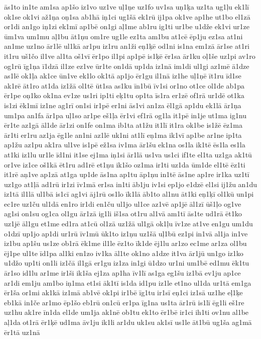 {ās1to
in1te
am1sa
ap1šo
iz1vo
uz1ve
uļ1ņe
uz1fo
uv1sa
uņ1ķa
uz1ta
ug1ļu
ek1lī
ok1se
ok1vi
až1ņa
oņ1sa
ab1hā
iņ1ci
ug1šā
ek1rū
ij1pa
ok1ve
ap1he
ut1bo
el1zā
or1di
an1go
iņ1zi
ek1mī
ap1bē
on1gi
aļ1me
ab1ru
ig1ti
ur1be
u1dže
ek1vi
ur1ze
ūm1va
um1mu
aļ1bu
āt1ņu
om1re
ug1le
ez1ta
am1bu
at1cē
ēp1ju
ez1sa
at1ni
an1me
uz1no
ār1lē
ul1kā
ar1pu
iz1ru
an1ži
eņ1ķē
od1ni
is1na
em1zā
ār1se
at1ri
it1ru
uš1čo
il1ve
al1ta
oš1vī
ēr1po
il1pi
ap1pē
is1ķē
ēr1sa
ār1ku
oļ1še
uz1pi
av1ro
og1rū
īg1ņa
ī1dzā
il1ze
ez1ve
ūr1te
on1dā
up1da
iz1nā
im1di
ul1gi
az1mē
ā1dze
as1lē
ok1ļa
ak1ce
ūn1ve
ek1lo
ok1tā
ap1jo
ēr1gu
il1nā
iz1he
uļ1ņē
īt1ru
īd1se
ak1rē
āt1ro
at1da
iz1žā
ol1tē
ūt1sa
as1ku
īn1bū
īv1si
or1no
ot1ce
ol1de
ab1pa
ēr1pe
oņ1ko
ok1na
ev1ze
us1ri
ip1ti
eķ1tu
op1ta
īs1ra
er1zē
of1rā
ur1dē
ot1ka
is1zi
ēk1mī
iz1ne
ag1rī
on1si
ir1pē
er1ni
ās1vi
an1za
ēl1gā
ap1du
ek1lā
ār1ņa
um1pa
an1fa
ār1pa
uļ1so
ar1pe
eš1ļa
ēr1vi
ef1rā
og1la
it1pē
in1je
ut1ma
ig1nu
ēr1te
az1gā
āl1de
ār1zi
on1fe
on1ma
ib1ta
at1žu
it1lī
it1ra
ok1be
is1žē
ēz1ma
ār1ti
er1ru
az1ja
ēg1le
an1ni
az1lē
uk1ni
at1lī
eņ1ma
ik1vī
ap1be
ar1ne
ip1ta
ap1žu
az1pu
ak1ra
ul1ve
is1pē
ež1sa
iv1ma
ār1šu
ek1na
os1la
ik1tē
ēs1la
es1la
at1ki
iz1lu
ur1le
īd1ni
it1se
ej1ma
iņ1si
ār1lā
us1va
us1ci
if1te
el1ta
uz1ga
ak1tū
or1ve
iz1ce
oš1kā
ēt1ru
ad1rē
et1ņu
ik1šo
oz1ma
ir1ti
uz1da
ūm1de
el1tē
ēz1ti
it1rē
aņ1ve
ap1zā
at1ga
up1de
ās1na
ap1tu
āp1ņu
in1tē
ās1ne
ap1re
ir1ka
uz1tī
uz1go
at1ļā
ad1rū
ir1zi
īv1mā
er1sa
in1ti
āb1ju
iv1si
ep1jo
e1dzē
el1si
ij1žu
an1du
iz1tā
il1lā
ul1bā
is1cī
ag1vi
āj1rū
os1lo
īk1lā
āb1to
al1nu
āt1ki
eņ1ķī
ol1kū
un1pi
ec1re
uz1ču
ul1dā
en1ro
ir1di
en1ču
ul1jo
ul1ce
az1vē
ap1jē
āl1zī
ūš1ļo
og1ve
ag1si
on1su
og1ca
ol1gu
ār1zā
ig1li
iš1sa
ot1ru
al1vā
am1tī
ās1te
ud1rā
ēt1ko
uz1jē
āl1gu
et1me
ed1ra
at1cū
ol1zā
uz1žā
ul1gā
ok1ļu
īv1ze
at1ve
en1gu
um1du
o1dzī
up1jo
ap1di
ur1rū
īv1mū
ūk1to
iz1ņu
uz1šā
uļ1bū
ez1pi
in1vā
al1ja
in1ve
iz1bu
ap1šu
us1ze
ob1rā
ēk1me
il1le
ēz1to
īk1de
ēj1lu
ar1zo
ec1me
ar1za
ol1bu
ēj1pe
ul1te
īd1pa
al1ki
en1zo
iv1ka
āl1te
ok1no
a1dze
it1va
ār1jū
un1go
iz1ko
u1džo
up1ti
on1li
iz1čā
il1gā
er1gu
iz1za
in1gi
ū1dzo
ur1ni
um1bē
ed1mu
ēk1tu
ār1so
id1lu
ar1me
ir1ši
ik1ša
ej1za
ap1ha
īv1lī
as1ga
eg1šu
iz1bā
ev1ju
ap1ce
ar1di
em1ju
am1bo
iņ1ma
et1si
āk1tī
is1da
id1pu
iz1le
et1no
ul1da
ur1tā
em1ga
ēr1ša
or1mi
ak1kā
iz1mā
ab1vē
ok1pi
ir1bē
īg1tu
ir1sī
eņ1ci
iz1sā
uz1he
eļ1ķe
eb1kā
in1če
ar1mo
ēp1šo
eb1rū
on1cū
er1pa
īg1na
us1ta
ār1rū
is1lī
ēg1li
eš1re
uz1hu
ak1re
īn1da
el1de
um1ja
ak1nē
ob1tu
ek1to
ēr1bē
ir1ci
ih1ti
ov1nu
al1be
aļ1da
ot1rā
ēr1ķē
ud1ma
āv1ju
ik1li
ar1du
uk1su
ak1sī
us1le
āt1bū
ug1ša
ag1mā
ēr1tā
uz1nā
}
